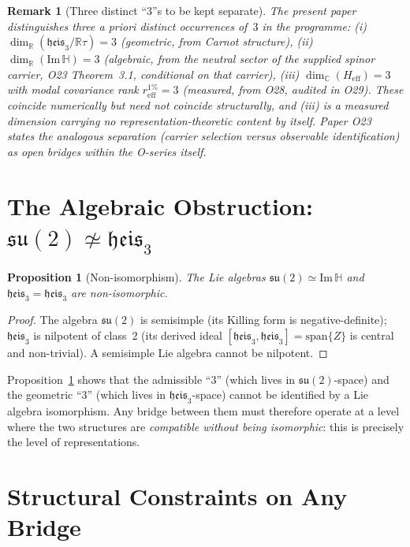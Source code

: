 \documentclass[11pt,a4paper]{article}
\newtheorem{proposition}[theorem]{Proposition}
\newtheorem{remark}[theorem]{Remark}
\newcommand{\Heff}{H_{\mathrm{eff}}}
\newcommand{\ImH}{\mathrm{Im}\,\mathbb{H}}
\newcommand{\su}{\mathfrak{su}}
\newcommand{\heis}{\mathfrak{heis}_3}
\begin{document}
    \begin{remark}[Three distinct ``3''s to be kept separate]
      \label{rem:three3s}
      The present paper distinguishes three a priori distinct occurrences of~$3$ in the programme:
      (i) $\dim_\mathbb{R}(\heis / \mathbb{R}\tau) = 3$ (geometric, from Carnot structure),
      (ii) $\dim_\mathbb{R}(\ImH) = 3$ (algebraic, from the neutral sector of the supplied
      spinor carrier, O23 Theorem~3.1, conditional on that carrier),
      (iii) $\dim_\mathbb{C}(\Heff) = 3$ with modal covariance rank $r_{\mathrm{eff}}^{1\%} = 3$
      (measured, from O28, audited in O29).
      These coincide numerically but need not coincide structurally, and (iii) is a measured
      dimension carrying no representation-theoretic content by itself.
      Paper O23~\cite{Beau2026a27} states the analogous separation (carrier selection versus
      observable identification) as open bridges within the O-series itself.
    \end{remark}

  \section{\texorpdfstring{The Algebraic Obstruction: $\su(2) \not\simeq \heis$}%
    {The Algebraic Obstruction: su(2) is not isomorphic to heis(3)}}
  \label{sec:obstruction}

  \begin{proposition}[Non-isomorphism]
    \label{prop:noniso}
    The Lie algebras $\su(2) \simeq \ImH$ and $\heis = \mathfrak{heis}_3$ are non-isomorphic.
  \end{proposition}

  \begin{proof}
    The algebra $\su(2)$ is semisimple (its Killing form is negative-definite); $\heis$ is
    nilpotent of class~$2$ (its derived ideal $[\heis, \heis] = \mathrm{span}\{Z\}$ is central and
    non-trivial).
    A semisimple Lie algebra cannot be nilpotent.
  \end{proof}

  \noindent
  Proposition~\ref{prop:noniso} shows that the admissible ``3'' (which lives in $\su(2)$-space)
  and the geometric ``3'' (which lives in $\heis$-space) cannot be identified by a Lie algebra
  isomorphism.
  Any bridge between them must therefore operate at a level where the two structures are
  \emph{compatible without being isomorphic}: this is precisely the level of representations.

  \section{Structural Constraints on Any Bridge}
  \label{sec:bridge}
\end{document}

